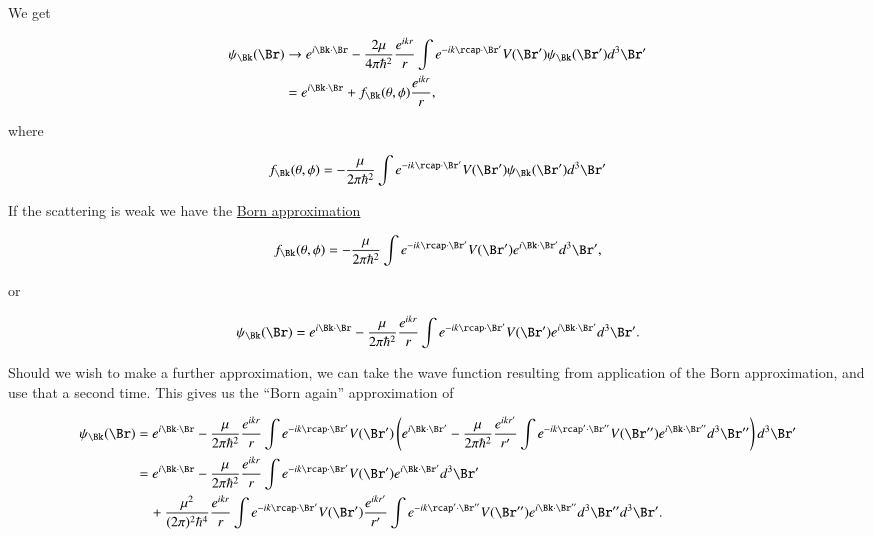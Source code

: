 We get 

\begin{equation}\label{eqn:qmTwoL25:210}
\begin{aligned}
\psi_\Bk(\Br) 
&\rightarrow e^{i \Bk \cdot \Br} - \frac{2 \mu}{4 \pi \hbar^2} \frac{ e^{i k r}}{r} \int e^{-i k \rcap \cdot \Br'} V(\Br') \psi_\Bk(\Br') d^3 \Br' \\
&=
e^{i \Bk \cdot \Br} + f_\Bk(\theta, \phi) \frac{ e^{i k r}}{r},
\end{aligned}
\end{equation}

where

\begin{equation}\label{eqn:qmTwoL25:230}
f_\Bk(\theta, \phi) =
- \frac{\mu}{2 \pi \hbar^2} \int e^{-i k \rcap \cdot \Br'} V(\Br') \psi_\Bk(\Br') d^3 \Br' 
\end{equation}

If the scattering is weak we have the \underline{Born approximation}

\begin{equation}\label{eqn:qmTwoL25:250}
f_\Bk(\theta, \phi) =
- \frac{\mu}{2 \pi \hbar^2} \int e^{-i k \rcap \cdot \Br'} V(\Br') e^{i \Bk \cdot \Br'} d^3 \Br',
\end{equation}

or

\begin{equation}\label{eqn:qmTwoL25:270}
\psi_\Bk(\Br) =
e^{i \Bk \cdot \Br} - \frac{\mu}{2 \pi \hbar^2} \frac{ e^{i k r}}{r} \int e^{-i k \rcap \cdot \Br'} V(\Br') e^{i \Bk \cdot \Br'} d^3 \Br'.
\end{equation}

Should we wish to make a further approximation, we can take the wave function resulting from application of the Born approximation, and use that a second time.  This gives us the ``Born again'' approximation of

\begin{equation}\label{eqn:qmTwoL25:290}
\begin{aligned}
\psi_\Bk(\Br) 
&=
e^{i \Bk \cdot \Br} - \frac{\mu}{2 \pi \hbar^2} \frac{ e^{i k r}}{r} \int e^{-i k \rcap \cdot \Br'} V(\Br') \left( 
e^{i \Bk \cdot \Br'} - \frac{\mu}{2 \pi \hbar^2} \frac{ e^{i k r'}}{r'} \int e^{-i k \rcap' \cdot \Br''} V(\Br'') e^{i \Bk \cdot \Br''} d^3 \Br''
\right) d^3 \Br' \\
&=
e^{i \Bk \cdot \Br} - \frac{\mu}{2 \pi \hbar^2} \frac{ e^{i k r}}{r} \int e^{-i k \rcap \cdot \Br'} V(\Br') e^{i \Bk \cdot \Br'} d^3 \Br' \\
&\quad +\frac{\mu^2}{(2 \pi)^2 \hbar^4}
\frac{ e^{i k r}}{r} 
\int e^{-i k \rcap \cdot \Br'} V(\Br') 
\frac{ e^{i k r'}}{r'} \int e^{-i k \rcap' \cdot \Br''} V(\Br'') e^{i \Bk \cdot \Br''} d^3 \Br'' d^3 \Br'.
\end{aligned}
\end{equation}

\EndArticle
